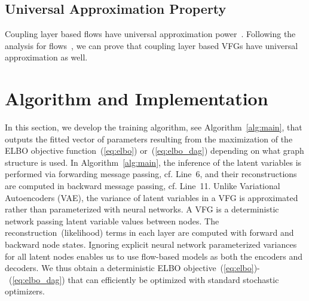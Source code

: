 \documentclass[sigconf, anonymous, review]{acmart}
\theoremstyle{plain}
\theoremstyle{definition}
\theoremstyle{remark}
\begin{document}
\subsection{Universal Approximation Property}
Coupling layer based flows have universal  approximation power~\cite{Takeshi2020}. Following the analysis for flows~\cite{Takeshi2020}, we can prove that coupling layer based VFGs have universal approximation as well. 

\section{Algorithm and Implementation}\label{sec:algrithm}
In this section, we develop the training algorithm, see Algorithm~\ref{alg:main}, that outputs the fitted vector of parameters resulting from the maximization of the ELBO objective function~(\ref{eq:elbo}) or~(\ref{eq:elbo_dag}) depending on what graph structure is used.
In Algorithm~\ref{alg:main}, the inference of the latent variables is performed via forwarding message passing, cf. Line~6, and their reconstructions are computed in backward message passing, cf. Line~11.
Unlike Variational Autoencoders (VAE), the variance of latent variables in a VFG is approximated rather than parameterized with neural networks. 
A VFG is a deterministic network passing latent variable values between nodes. 
The reconstruction~(likelihood) terms in each layer are computed with forward and backward node states. 
Ignoring explicit neural network parameterized variances for all latent nodes enables us to use flow-based models as both the encoders and decoders. 
We thus obtain a deterministic ELBO objective~(\ref{eq:elbo})-~(\ref{eq:elbo_dag}) that can efficiently be optimized with standard stochastic optimizers. 
\end{document}
